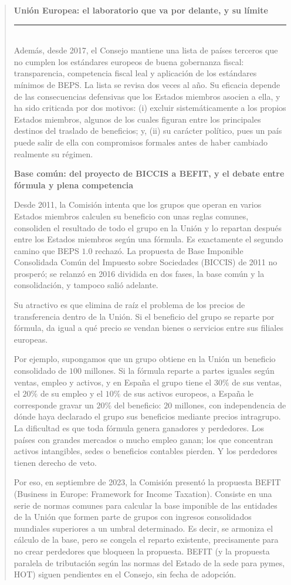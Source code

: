 \documentclass[10pt,a4paper]{article}
\newenvironment{specialblock}[1]{%
      \begin{quote} %
      \small %
      \noindent\textbf{#1}\\[-0.3em] %
      \rule{\linewidth}{0.4pt}\\[0.6em]}{
      \end{quote}}
\begin{document}
\begin{specialblock}{\textbf{Unión Europea}: el laboratorio que va por delante, y su límite}
    Además, desde 2017, el Consejo mantiene una lista de países terceros que no cumplen los estándares europeos de buena gobernanza fiscal: transparencia, competencia fiscal leal y aplicación de los estándares mínimos de BEPS. La lista se revisa dos veces al año. Su eficacia depende de las consecuencias defensivas que los Estados miembros asocien a ella, y ha sido criticada por dos motivos: (i) excluir sistemáticamente a los propios Estados miembros, algunos de los cuales figuran entre los principales destinos del traslado de beneficios; y, (ii) su carácter político, pues un país puede salir de ella con compromisos formales antes de haber cambiado realmente su régimen.
    
    \textbf{Base común: del proyecto de BICCIS a BEFIT, y el debate entre fórmula y plena competencia}
    
    Desde 2011, la Comisión intenta que los grupos que operan en varios Estados miembros calculen su beneficio con unas reglas comunes, consoliden el resultado de todo el grupo en la Unión y lo repartan después entre los Estados miembros según una fórmula. Es exactamente el segundo camino que BEPS $1.0$ rechazó. La propuesta de Base Imponible Consolidada Común del Impuesto sobre Sociedades (BICCIS) de 2011 no prosperó; se relanzó en 2016 dividida en dos fases, la base común y la consolidación, y tampoco salió adelante.
    
    Su atractivo es que elimina de raíz el problema de los precios de transferencia dentro de la Unión. Si el beneficio del grupo se reparte por fórmula, da igual a qué precio se vendan bienes o servicios entre sus filiales europeas. 
    
    Por ejemplo, supongamos que un grupo obtiene en la Unión un beneficio consolidado de $100$ millones. Si la fórmula reparte a partes iguales según ventas, empleo y activos, y en España el grupo tiene el $30\%$ de sus ventas, el $20\%$ de su empleo y el $10\%$ de sus activos europeos, a España le corresponde gravar un $20\%$ del beneficio: $20$ millones, con independencia de dónde haya declarado el grupo sus beneficios mediante precios intragrupo. La dificultad es que toda fórmula genera ganadores y perdedores. Los países con grandes mercados o mucho empleo ganan; los que concentran activos intangibles, sedes o beneficios contables pierden. Y los perdedores tienen derecho de veto.
    
    Por eso, en septiembre de 2023, la Comisión presentó la propuesta BEFIT (Business in Europe: Framework for Income Taxation). Consiste en una serie de normas comunes para calcular la base imponible de las entidades de la Unión que formen parte de grupos con ingresos consolidados mundiales superiores a un umbral determinado. Es decir, se armoniza el cálculo de la base, pero se congela el reparto existente, precisamente para no crear perdedores que bloqueen la propuesta. BEFIT (y la propuesta paralela de tributación según las normas del Estado de la sede para pymes, HOT) siguen pendientes en el Consejo, sin fecha de adopción.
    

\end{specialblock}
\end{document}
